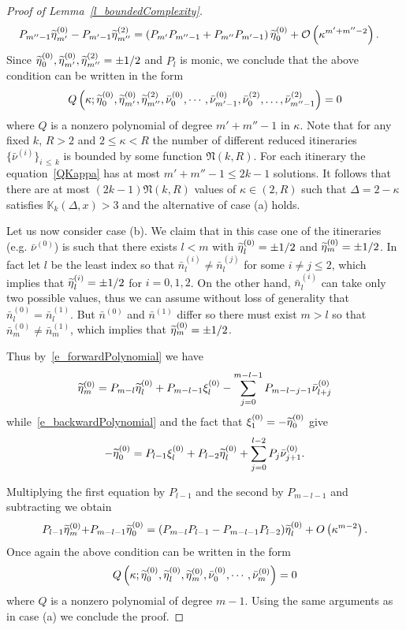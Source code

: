 \documentclass[AHL, Unicode, longabstracts,published]{cedram}
\newcommand{\LC}{\mathbb{K}}
\newcommand{\fkN}{\mathfrak{N}}
\newcommand{\cO}{\mathcal{O}}
\newcommand{\indexItinPrivate}[1]{^{(#1)}}
\newcommand{\dnt}[1]{\bar\nu\indexItinPrivate{#1}}
\newcommand{\nt}[1]{\bar n\indexItinPrivate{#1}}
\newcommand{\xit}[1]{\xi\indexItinPrivate{#1}}
\newcommand{\teta}{\tilde\eta}
\newcommand{\tetat}[1]{\teta\indexItinPrivate{#1}}
\let\oldtilde\tilde
\renewcommand*{\tilde}[1]{\mathchoice{\widetilde{#1}}{\widetilde{#1}}{\oldtilde{#1}}{\oldtilde{#1}}}
\begin{document}
\begin{proof}[Proof of Lemma~\ref{l_boundedComplexity}]
\begin{align*}
P_{m''-1}\tetat0_{m'}-P_{m'-1}\tetat2_{m''} &= \left(P_{m'}P_{m''-1}+P_{m''}P_{m'-1}\right)\tetat0_{0}+\cO\left(\kappa^{m'+m''-2}\right).
\end{align*}
Since $\tetat0_0, \tetat0_{m'}, \tetat2_{m''} = \pm1/2$ and $P_l$ is monic, we conclude that the above condition can be written in the form
\begin{align}\label{QKappa}
Q\left(\kappa;\tetat0_0,\tetat0_{m'},\tetat2_{m''},\dnt0_0,\cdots,\dnt0_{m'-1},\dnt2_0,\dots,\dnt2_{m''-1}\right) = 0
\end{align}
where $Q$ is a nonzero polynomial of degree $m'+m''-1$ in $\kappa$. Note that for any fixed $k$, $R > 2$ and $2\le \kappa < R$ the number of different reduced itineraries $\{\dnt{i}\}_{i\,\leq\,k}$ is bounded by some function $\fkN(k, R).$ For each itinerary the equation~\eqref{QKappa} has at most $m'+m''-1\leq 2k-1$ solutions. It follows that there are at most $(2k-1) \fkN(k, R)$ values of $\kappa\in (2, R)$ such that $\Delta=2-\kappa$ satisfies $\LC_k(\Delta,x) > 3$ and the alternative of case (a) holds.

Let us now consider case (b). We claim that in this case one of the itineraries (e.g. $\dnt0$) is such that there exists $l < m$ with $\tetat0_l = \pm1/2$ and $\tetat0_m = \pm1/2$. In fact let $l$ be the least index so that $\nt{i}_l\ne\nt{j}_l$ for some $i\!\ne\! j\!{ \le\! 2}$, which implies that $\tetat{i}_l = \pm1/2$ for $i = 0,1,2$. On the other hand, $\nt{i}_l$ can take only two possible values, thus we can assume without loss of generality that $\nt{0}_l = \nt{1}_l$. But $\nt0$ and $\nt1$ differ so there must exist $m > l$ so that $\nt{0}_m\ne\nt{1}_m$, which implies that $\tetat{0}_m = \pm1/2$.

Thus by~\eqref{e_forwardPolynomial} we have
\begin{align*}
\tetat0_{m} = P_{m-l}\tetat0_l + P_{m-l-1}\xit0_l - \sum_{j = 0}^{m-l-1}P_{m-l-j-1}\dnt0_{l+j}
\end{align*}
while~\eqref{e_backwardPolynomial} and the fact that $\xit0_1=-\tetat0_0$ give
\begin{align*}
{-}\tetat0_{0} = P_{l-1}\xit0_l + P_{l-2}\tetat0_l + \sum_{j = 0}^{l-2}P_j\dnt0_{j+1}.
\end{align*}

Multiplying the first equation by $P_{l-1}$ and the second by $P_{m-l-1}$ and subtracting we obtain
\begin{align*}
P_{l-1}\tetat0_m{+}P_{m-l-1}\tetat0_0 = (P_{m-l}P_{l-1}-P_{m-l-1}P_{l-2})\tetat0_l+O\left(\kappa^{m-2}\right).
\end{align*}
Once again the above condition can be written in the form
\begin{align*}
Q\left(\kappa;\tetat0_0,\tetat0_l,\tetat0_m,\dnt0_0,\cdots,\dnt0_m\right) = 0
\end{align*}
where $Q$ is a nonzero polynomial of degree $m-1$. Using the same arguments as in case (a) we conclude the proof.
\end{proof}


\end{document}
